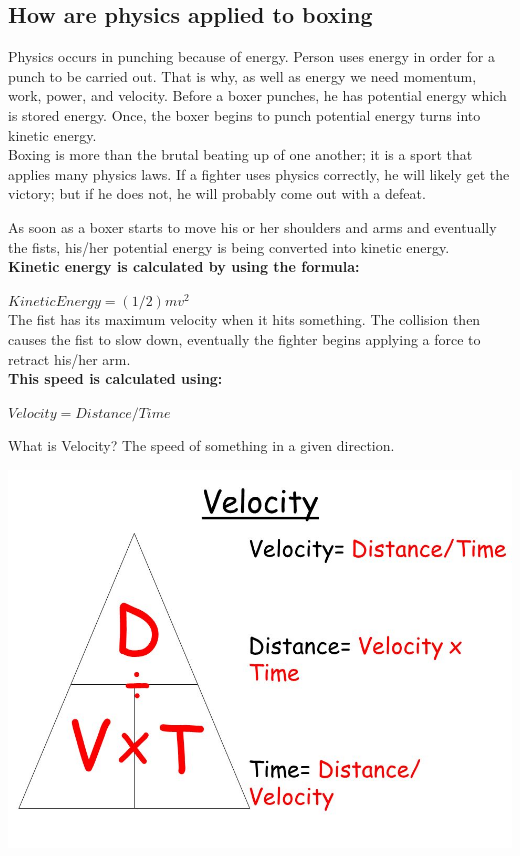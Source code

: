 \documentclass[a4paper,12pt,twoside]{report}
\begin{document}
\subsection{How are physics applied to boxing}
Physics occurs in punching because of energy. Person uses energy in order for a punch to be carried out. That is why, as well as energy we need momentum, work, power, and velocity. Before a boxer punches, he has potential energy which is stored energy. Once, the boxer begins to punch potential energy turns into kinetic energy.\\
Boxing is more than the brutal beating up of one another; it is a sport that applies many physics laws. If a fighter uses physics correctly, he will likely get the victory; but if he does not, he will probably come out with a defeat.

As soon as a boxer starts to move his or her shoulders and arms and eventually the fists, his/her potential energy is being converted into kinetic energy.\\

\textbf{Kinetic energy is calculated by using the formula:}

$Kinetic Energy = (1/2)mv^2$\\

The fist has its maximum velocity when it hits something. The collision then causes the fist to slow down, eventually the fighter begins applying a force to retract his/her arm.\\

\textbf{This speed is calculated using:}

$Velocity = Distance / Time$

What is Velocity? The speed of something in a given direction.\cite{boxPhysics}

\begin{center}
\includegraphics[scale=.3]{images/Velocity.jpeg}
\end{center}
\end{document}
